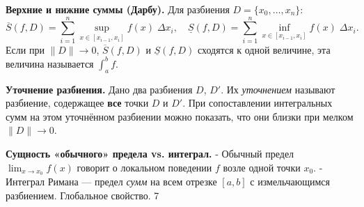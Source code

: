 
\textbf{Верхние и нижние суммы (Дарбу).}
Для разбиения $D=\{x_0,\dots,x_n\}$:
\[
\overline{S}(f,D)=\sum_{i=1}^n \sup\limits_{x\in[x_{i-1},x_i]}f(x)\;\Delta x_i,
\quad
\underline{S}(f,D)=\sum_{i=1}^n \inf\limits_{x\in[x_{i-1},x_i]}f(x)\;\Delta x_i.
\]
Если при $\|D\|\to 0$, \(\overline{S}(f,D)\) и \(\underline{S}(f,D)\) сходятся к одной величине, эта величина называется \(\int_a^b f\).

\medskip

\textbf{Уточнение разбиения.}
Дано два разбиения $D$, $D'$. Их \emph{уточнением} называют разбиение, содержащее \textbf{все} точки $D$ и $D'$. При сопоставлении интегральных сумм на этом уточнённом разбиении можно показать, что они близки при мелком $\|D\|\to 0$.

\medskip

\textbf{Сущность «обычного» предела vs. интеграл.}
- Обычный предел $\lim_{x\to x_0}f(x)$ говорит о локальном поведении $f$ возле одной точки $x_0$.  
- Интеграл Римана — предел \emph{сумм} на всем отрезке $[a,b]$ с измельчающимся разбиением. Глобальное свойство.
7